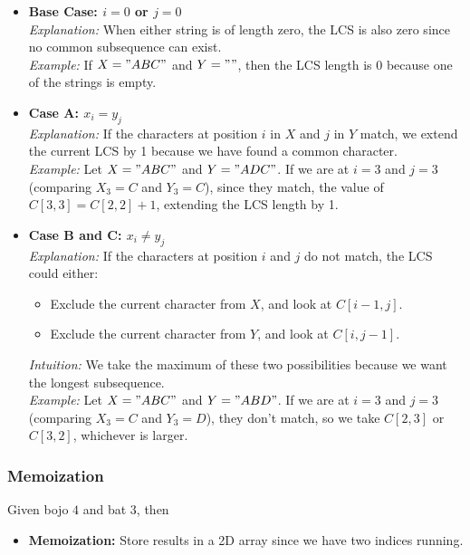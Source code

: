 \begin{intuition}
    \begin{itemize}
        \item \textbf{Base Case: \(i = 0\) or \(j = 0\)}\\
        \textit{Explanation:} When either string is of length zero, the LCS is also zero since no common subsequence can exist.\\
        \textit{Example:} If \(X = "ABC"\) and \(Y = ""\), then the LCS length is 0 because one of the strings is empty.
    
        \item \textbf{Case A: \(x_i = y_j\)}\\
        \textit{Explanation:} If the characters at position \(i\) in \(X\) and \(j\) in \(Y\) match, we extend the current LCS by 1 because we have found a common character.\\
        \textit{Example:} Let \(X = "ABC"\) and \(Y = "ADC"\). If we are at \(i = 3\) and \(j = 3\) (comparing \(X_3 = C\) and \(Y_3 = C\)), since they match, the value of \(C[3,3] = C[2,2] + 1\), extending the LCS length by 1.
    
        \item \textbf{Case B and C: \(x_i \neq y_j\)}\\
        \textit{Explanation:} If the characters at position \(i\) and \(j\) do not match, the LCS could either:
        \begin{itemize}
            \item Exclude the current character from \(X\), and look at \(C[i-1,j]\).
            \item Exclude the current character from \(Y\), and look at \(C[i,j-1]\).
        \end{itemize}
        \textit{Intuition:} We take the maximum of these two possibilities because we want the longest subsequence.\\
        \textit{Example:} Let \(X = "ABC"\) and \(Y = "ABD"\). If we are at \(i = 3\) and \(j = 3\) (comparing \(X_3 = C\) and \(Y_3 = D\)), they don’t match, so we take \(C[2,3]\) or \(C[3,2]\), whichever is larger.
    \end{itemize}    
\end{intuition}

\subsubsection{Memoization}
\begin{example}
    Given bojo $4$ and bat $3$, then 
    \begin{example}
    \end{example}
    \begin{itemize}
        \item \textbf{Memoization:} Store results in a 2D array since we have two indices running.
    \end{itemize}
\end{example}

